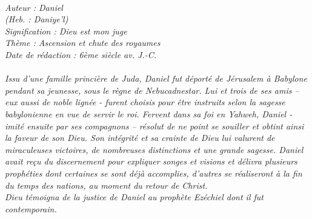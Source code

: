 \BFont
\noindent\hrulefill
{\footnotesize
\textit{
\bigskip
{\centering{}
\\Auteur : Daniel
\\(Heb. : Daniye'l)
\\Signification : Dieu est mon juge
\\Thème : Ascension et chute des royaumes
\\Date de rédaction : 6ème siècle av. J.-C.\\}
}
\textit{
\\Issu d’une famille princière de Juda, Daniel fut déporté de Jérusalem à Babylone pendant sa jeunesse, sous le règne de Nebucadnestar. Lui et trois de ses amis – eux aussi de noble lignée - furent choisis pour être instruits selon la sagesse babylonienne en vue de servir le roi. Fervent dans sa foi en Yahweh, Daniel -  imité ensuite par ses compagnons – résolut de ne point se souiller et obtint ainsi la faveur de son Dieu. Son intégrité et sa crainte de Dieu lui valurent de miraculeuses victoires, de nombreuses distinctions et une grande sagesse. Daniel avait reçu du discernement pour expliquer songes et visions et délivra plusieurs prophéties dont certaines se sont déjà accomplies, d’autres se réaliseront à la fin du temps des nations, au moment du retour de Christ.
\\Dieu témoigna de la justice de Daniel au prophète Ezéchiel dont il fut contemporain.\bigskip
}
}
\par\nobreak\noindent\hrulefill
